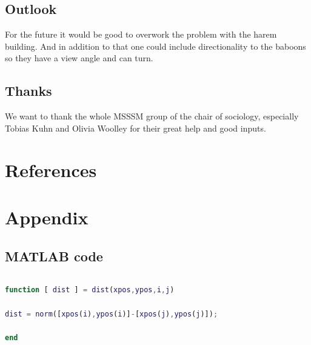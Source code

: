 \documentclass[11pt]{article}
\begin{document}
\subsection{Outlook}
\label{sec:Outlook}
For the future it would be good to overwork the problem with the harem building. And in addition to that one could include directionality to the baboons so they have a view angle and can turn.

\subsection{Thanks}
We want to thank the whole MSSSM group of the chair of sociology, especially Tobias Kuhn and Olivia Woolley for their great help and good inputs.\\

\pagebreak
\section{References}


\nocite{Dunbar1979}
\nocite{Dunbar1983}
\nocite{Dunbar1984}
\nocite{Dunbar1986}
\nocite{Crook1966}
\nocite{Kawai1983}
\nocite{Ohsawa1984}
\nocite{Gruter2004}

\newpage

\section{Appendix}
\subsection{MATLAB code}
\begin{lstlisting}[language=Matlab, backgroundcolor=\color{blue!10}, frame=single, framerule=0.1pt,commentstyle=\color{blue}, caption=main: SIMonkey\_live.m]

\end{lstlisting}

\begin{lstlisting}[language=Matlab, backgroundcolor=\color{blue!10}, frame=single, framerule=0.1pt,commentstyle=\color{blue}, caption=function: dist.m]
function [ dist ] = dist(xpos,ypos,i,j)

dist = norm([xpos(i),ypos(i)]-[xpos(j),ypos(j)]);

end
\end{lstlisting}
\end{document}

